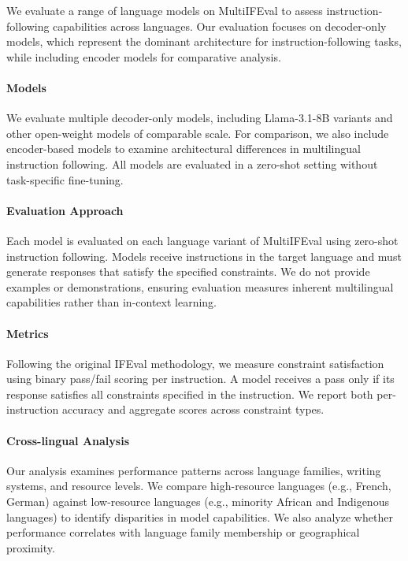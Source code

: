 \documentclass[11pt]{article}
\begin{document}
We evaluate a range of language models on MultiIFEval to assess instruction-following capabilities across languages. Our evaluation focuses on decoder-only models, which represent the dominant architecture for instruction-following tasks, while including encoder models for comparative analysis.

\paragraph{Models}
We evaluate multiple decoder-only models, including Llama-3.1-8B variants and other open-weight models of comparable scale. For comparison, we also include encoder-based models to examine architectural differences in multilingual instruction following. All models are evaluated in a zero-shot setting without task-specific fine-tuning.

\paragraph{Evaluation Approach}
Each model is evaluated on each language variant of MultiIFEval using zero-shot instruction following. Models receive instructions in the target language and must generate responses that satisfy the specified constraints. We do not provide examples or demonstrations, ensuring evaluation measures inherent multilingual capabilities rather than in-context learning.

\paragraph{Metrics}
Following the original IFEval methodology, we measure constraint satisfaction using binary pass/fail scoring per instruction. A model receives a pass only if its response satisfies all constraints specified in the instruction. We report both per-instruction accuracy and aggregate scores across constraint types.

\paragraph{Cross-lingual Analysis}
Our analysis examines performance patterns across language families, writing systems, and resource levels. We compare high-resource languages (e.g., French, German) against low-resource languages (e.g., minority African and Indigenous languages) to identify disparities in model capabilities. We also analyze whether performance correlates with language family membership or geographical proximity.
\end{document}
